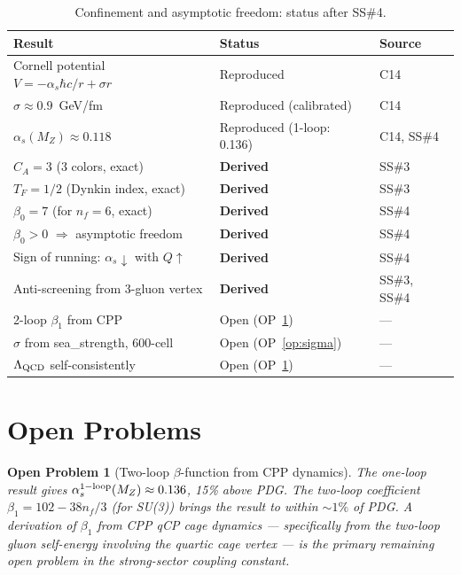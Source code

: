 \documentclass[11pt,a4paper]{article}
\newtheorem{openprob}[theorem]{Open Problem}
\newcommand{\as}{\alpha_s}
\begin{document}
\begin{table}[H]
\centering
\caption{Confinement and asymptotic freedom: status after SS\#4.}
\label{tab:status}
\begin{tabular}{@{}lll@{}}
\toprule
Result & Status & Source \\
\midrule
Cornell potential $V = -\as\hbar c/r + \sigma r$ & Reproduced & C14 \\
$\sigma \approx 0.9$~GeV/fm & Reproduced (calibrated) & C14 \\
$\as(M_Z) \approx 0.118$ & Reproduced (1-loop: 0.136) & C14, SS\#4 \\
$C_A = 3$ (3 colors, exact) & \textbf{Derived} & SS\#3 \\
$T_F = 1/2$ (Dynkin index, exact) & \textbf{Derived} & SS\#3 \\
$\beta_0 = 7$ (for $n_f = 6$, exact) & \textbf{Derived} & SS\#4 \\
$\beta_0 > 0$ $\Rightarrow$ asymptotic freedom & \textbf{Derived} & SS\#4 \\
Sign of running: $\as \downarrow$ with $Q\uparrow$ & \textbf{Derived} & SS\#4 \\
Anti-screening from 3-gluon vertex & \textbf{Derived} & SS\#3, SS\#4 \\
\midrule
2-loop $\beta_1$ from CPP & Open (OP~\ref{op:alphas}) & --- \\
$\sigma$ from sea\_strength, 600-cell & Open (OP~\ref{op:sigma}) & --- \\
$\Lambda_{\rm QCD}$ self-consistently & Open (OP~\ref{op:alphas}) & --- \\
\bottomrule
\end{tabular}
\end{table}

\section{Open Problems}

\begin{openprob}[Two-loop $\beta$-function from CPP dynamics]
\label{op:alphas}
The one-loop result gives $\as^{\rm 1-loop}(M_Z) \approx 0.136$,
15\% above PDG.  The two-loop coefficient
$\beta_1 = 102 - 38n_f/3$ (for SU(3)) brings the result to
within $\sim1\%$ of PDG.  A derivation of $\beta_1$ from CPP
qCP cage dynamics --- specifically from the two-loop gluon
self-energy involving the quartic cage vertex --- is the primary
remaining open problem in the strong-sector coupling constant.
\end{openprob}
\end{document}
